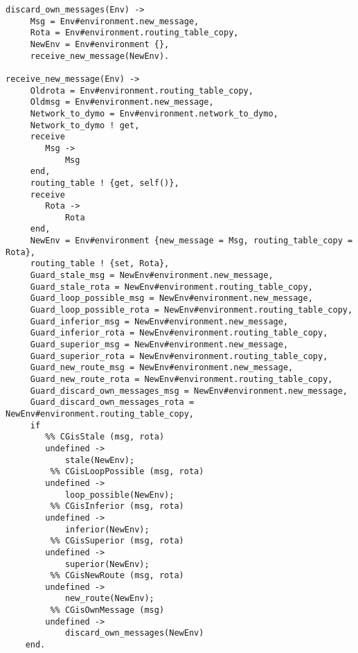 \begin{verbatim}
discard_own_messages(Env) -> 
     Msg = Env#environment.new_message,
     Rota = Env#environment.routing_table_copy,
     NewEnv = Env#environment {},
     receive_new_message(NewEnv).

receive_new_message(Env) -> 
     Oldrota = Env#environment.routing_table_copy,
     Oldmsg = Env#environment.new_message,
     Network_to_dymo = Env#environment.network_to_dymo,
     Network_to_dymo ! get,
     receive 
        Msg -> 
            Msg
     end,
     routing_table ! {get, self()},
     receive 
        Rota -> 
            Rota
     end,
     NewEnv = Env#environment {new_message = Msg, routing_table_copy = Rota},
     routing_table ! {set, Rota},
     Guard_stale_msg = NewEnv#environment.new_message,
     Guard_stale_rota = NewEnv#environment.routing_table_copy,
     Guard_loop_possible_msg = NewEnv#environment.new_message,
     Guard_loop_possible_rota = NewEnv#environment.routing_table_copy,
     Guard_inferior_msg = NewEnv#environment.new_message,
     Guard_inferior_rota = NewEnv#environment.routing_table_copy,
     Guard_superior_msg = NewEnv#environment.new_message,
     Guard_superior_rota = NewEnv#environment.routing_table_copy,
     Guard_new_route_msg = NewEnv#environment.new_message,
     Guard_new_route_rota = NewEnv#environment.routing_table_copy,
     Guard_discard_own_messages_msg = NewEnv#environment.new_message,
     Guard_discard_own_messages_rota = NewEnv#environment.routing_table_copy,
     if
        %% CGisStale (msg, rota)
        undefined ->
            stale(NewEnv);
         %% CGisLoopPossible (msg, rota)
        undefined ->
            loop_possible(NewEnv);
         %% CGisInferior (msg, rota)
        undefined ->
            inferior(NewEnv);
         %% CGisSuperior (msg, rota)
        undefined ->
            superior(NewEnv);
         %% CGisNewRoute (msg, rota)
        undefined ->
            new_route(NewEnv);
         %% CGisOwnMessage (msg)
        undefined ->
            discard_own_messages(NewEnv)
    end.
\end{verbatim}
\normalsize
